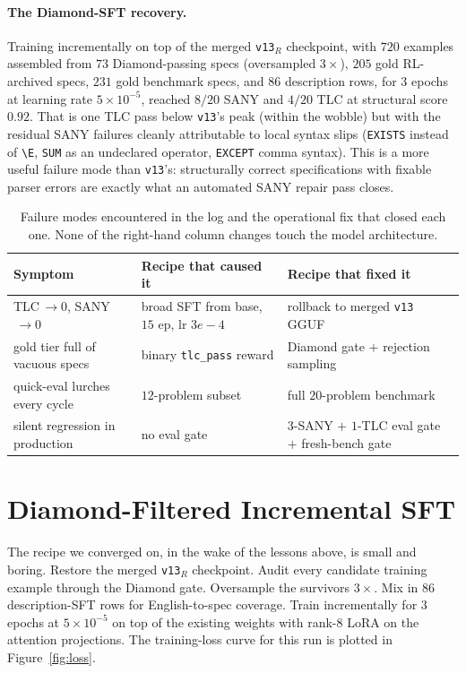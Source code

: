 \documentclass[11pt]{article}
\begin{document}
\paragraph{The Diamond-SFT recovery.} Training incrementally on top of
the merged \texttt{v13}$_R$ checkpoint, with $720$ examples assembled
from $73$ Diamond-passing specs (oversampled $3\!\times$), $205$ gold
RL-archived specs, $231$ gold benchmark specs, and $86$ description
rows, for $3$ epochs at learning rate $5\!\times\!10^{-5}$, reached
$8/20$ SANY and $4/20$ TLC at structural score $0.92$. That is one TLC
pass below \texttt{v13}'s peak (within the wobble) but with the
residual SANY failures cleanly attributable to local syntax slips
(\texttt{EXISTS} instead of \texttt{\textbackslash E}, \texttt{SUM} as
an undeclared operator, \texttt{EXCEPT} comma syntax). This is a more
useful failure mode than \texttt{v13}'s: structurally correct
specifications with fixable parser errors are exactly what an automated
SANY repair pass closes.

\begin{table}[t]
\centering
\small
\begin{tabular}{l l l}
\toprule
Symptom & Recipe that caused it & Recipe that fixed it \\
\midrule
TLC$\,\to 0$, SANY$\,\to 0$ & broad SFT from base, $15$ ep, lr $3e\!-\!4$ &
  rollback to merged \texttt{v13} GGUF \\
gold tier full of vacuous specs & binary \texttt{tlc\_pass} reward &
  Diamond gate $+$ rejection sampling \\
quick-eval lurches every cycle & $12$-problem subset &
  full $20$-problem benchmark \\
silent regression in production & no eval gate &
  $3$-SANY $+$ $1$-TLC eval gate $+$ fresh-bench gate \\
\bottomrule
\end{tabular}
\caption{Failure modes encountered in the log and the operational fix
that closed each one. None of the right-hand column changes touch the
model architecture.}
\label{tab:lessons}
\end{table}

\section{Diamond-Filtered Incremental SFT}
\label{sec:diamond-sft}

The recipe we converged on, in the wake of the lessons above, is small
and boring. Restore the merged \texttt{v13}$_R$ checkpoint. Audit every
candidate training example through the Diamond gate. Oversample the
survivors $3\!\times$. Mix in $86$ description-SFT rows for
English-to-spec coverage. Train incrementally for $3$ epochs at
$5\!\times\!10^{-5}$ on top of the existing weights with rank-$8$ LoRA
on the attention projections. The training-loss curve for this run is
plotted in Figure~\ref{fig:loss}.
\end{document}
